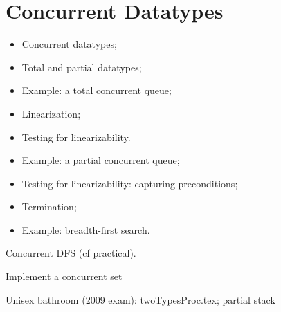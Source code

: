 \chapter{Concurrent Datatypes}
\label{chap:datatypes}




\begin{slide}

\begin{itemize}
\item 
Concurrent datatypes;

\item
Total and partial datatypes;

\item Example: a total concurrent queue;

\item
Linearization; 

\item Testing for linearizability.

\item 
Example: a partial concurrent queue;

\item
Testing for linearizability: capturing preconditions;

\item 
Termination;

\item Example: breadth-first search.

\end{itemize}
\end{slide}


\exercises


Concurrent DFS (cf practical). %

Implement a concurrent set %

Unisex bathroom (2009 exam): twoTypesProc.tex; 
partial stack
